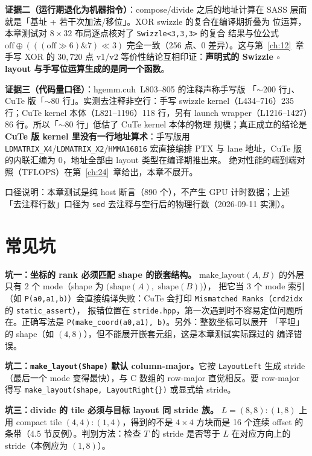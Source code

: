 \textbf{证据二（运行期退化为机器指令）}：compose/divide 之后的地址计算在
SASS 层面就是「基址 + 若干次加法/移位」。XOR swizzle 的复合在编译期折叠为
位运算，本章测试对 $8\times32$ 布局逐点核对了 \texttt{Swizzle\allowbreak{}<3,\allowbreak{}3,\allowbreak{}3>} 的复合
结果与位公式 $\mathrm{off}\oplus(((\mathrm{off}\gg6)\mathbin{\&}7)\ll3)$
完全一致（256 点、0 差异）。这与第~\ref{ch:12}~章手写 XOR 的
$30{,}720$ 点 v1/v2 等价性结论互相印证：\textbf{声明式的 Swizzle $\circ$ layout
与手写位运算生成的是同一个函数}。

\textbf{证据三（代码量口径）}：hgemm.cuh~L803--805 的注释声称手写版
「$\sim$200 行」、CuTe 版「$\sim$80 行」。实测去注释非空行：手写 swizzle
kernel（L434--716）235 行；CuTe kernel 本体（L821--1196）118 行，另有 launch
wrapper（L1216--1427）86 行。所以「$\sim$80 行」低估了 CuTe kernel 本体的物理
规模；真正成立的结论是\textbf{CuTe 版 kernel 里没有一行地址算术}：手写版用
\texttt{LDMATRIX\_X4}/\texttt{LDMATRIX\_X2}/\texttt{HMMA16816} 宏直接编排 PTX
与 lane 地址，CuTe 版的内联汇编为 0，地址全部由 layout 类型在编译期推出来。
绝对性能的端到端对照（TFLOPS）在第~\ref{ch:24}~章给出，本章不展开。

口径说明：本章测试是纯 host 断言（890 个），不产生 GPU 计时数据；上述
「去注释行数」口径为 \texttt{sed} 去注释与空行后的物理行数（2026-09-11 实测）。

\section{常见坑}

\textbf{坑一：坐标的 rank 必须匹配 shape 的嵌套结构。}
$\mathrm{make\_layout}(A,B)$ 的外层只有 2 个 mode（shape 为
$\bigl(\mathrm{shape}(A),$ $\mathrm{shape}(B)\bigr)$），
把它当 3 个 mode 索引
（如 \texttt{P(a0,a1,b)}）会直接编译失败：CuTe 会打印
\texttt{Mismatched Ranks}（\texttt{crd2idx} 的 \texttt{static\_\allowbreak{}assert}），
报错位置在 \texttt{stride.hpp}，第一次遇到时不容易定位问题所在。正确写法是
\texttt{P\allowbreak{}(make\_\allowbreak{}coord}\allowbreak\texttt{(a0,a1), b)}。另外：整数坐标可以展开
「平坦」的 shape（如 $(4,8)$），但不能展开嵌套元组，这是本章测试实际踩过的
编译错误。

\textbf{坑二：\texttt{make\_\allowbreak{}layout\allowbreak{}(Shape)} 默认 column-major。}它按
\texttt{LayoutLeft} 生成 stride（最后一个 mode 变得最快），与 C 数组的
row-major 直觉相反。要 row-major 得写 \texttt{make\_\allowbreak{}layout\allowbreak{}(shape,\allowbreak{}
Layout\allowbreak{}Right\{\})} 或显式给 stride。

\textbf{坑三：divide 的 tile 必须与目标 layout 同 stride 族。}
$L=(8,8){:}(1,8)$ 上用 compact tile $(4,4){:}(1,4)$，得到的不是 $4\times4$
方块而是 16 个连续 offset 的条带（4.5 节反例）。判别方法：检查
$T$ 的 stride 是否等于 $L$ 在对应方向上的 stride（本例应为 $(1,8)$）。

